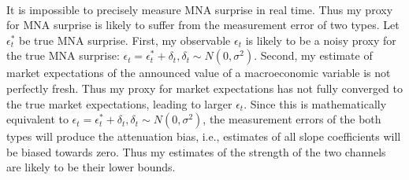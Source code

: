 \documentclass[12pt]{article}
\begin{document}
\paragraph{}
It is impossible to precisely measure MNA surprise in real time. Thus my proxy for MNA surprise is likely to suffer from the measurement error of two types. Let $\epsilon^*_t$ be true MNA surprise. First, my observable $\epsilon_t$ is likely to be a noisy proxy for the true MNA surprise: $\epsilon_t = \epsilon^*_t + \delta_t, \delta_t \sim{N(0, \sigma^2)}$. Second, my estimate of market expectations of the announced value of a macroeconomic variable is not perfectly fresh. Thus my proxy for market expectations has not fully converged to the true market expectations, leading to larger $\epsilon_t$. Since this is mathematically equivalent to $\epsilon_t = \epsilon^*_t + \delta_t, \delta_t \sim{N(0, \sigma^2)}$, the measurement errors of the both types will produce the attenuation bias, i.e., estimates of all slope coefficients will be biased towards zero. Thus my estimates of the strength of the two channels are likely to be their lower bounds.
\end{document}
